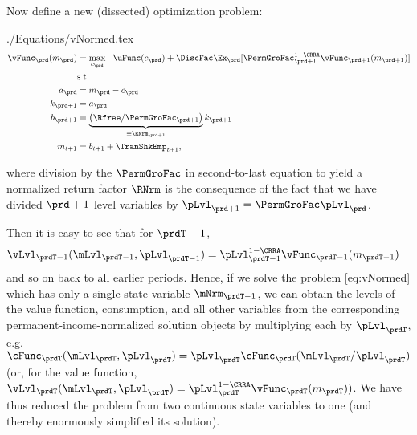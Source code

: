 \documentclass[\econtexRoot/SolvingMicroDSOPs]{subfiles}
\begin{document}
Now define a new (dissected) optimization problem:
\begin{verbatimwrite}{./Equations/vNormed.tex}
  \begin{equation}\begin{gathered}\begin{aligned}
        {\vFunc}_{\prd}({m}_{\prd}) & = \max_{{c}_{\prd}} ~~ \uFunc({c}_{\prd})+
        {\DiscFac}\Ex_{\prd}[ \PermGroFac_{\prd+1}^{1-\CRRA}{\vFunc}_{\prd+1}({m}_{\prd+1})] \label{eq:vNormed}                   \\
                                         & \text{s.t.}                                                                                 \\
        {a}_{\prd}                       & = {m}_{\prd}-{c}_{\prd}                                                                     \\
        {k}_{\prd+1}                     & = {a}_{\prd}                                                                                \\
        {b}_{\prd+1}                     & = \underbrace{\left(\Rfree/\PermGroFac_{\prd+1}\right)}_{\equiv \RNrm_{\prd+1}}{k}_{\prd+1} \\
        {m}_{t+1}                        & = {b}_{t+1}+\TranShkEmp_{t+1},
      \end{aligned}\end{gathered}\end{equation}
\end{verbatimwrite}
\unskip
where division by the $\PermGroFac$ in second-to-last equation to yield a normalized return factor $\RNrm$ is the consequence of the fact that we have divided $\prd+1$ level variables by $\pLvl_{\prd+1}=\PermGroFac\pLvl_{\prd}$.

Then it is easy to see that for $\prdT-1$, 
\begin{equation*}\begin{gathered}\begin{aligned}
      {\vLvl}_{\prdT-1}(\mLvl_{\prdT-1},\pLvl_{\prdT-1}) & =  \pLvl_{\prdT-1}^{1-\CRRA}{\vFunc}_{\prdT-1}({m}_{\prdT-1})
    \end{aligned}\end{gathered}\end{equation*}
and so on back to all earlier periods.  Hence, if we solve the problem \eqref{eq:vNormed} which has only a single state variable $\mNrm_{\prdT-1}$, we can obtain the levels of the value function, consumption, and all other variables from the corresponding permanent-income-normalized solution objects by multiplying each by $\pLvl_{\prdT}$, e.g.\ ${\cFunc}_{\prdT}(\mLvl_{\prdT},\pLvl_{\prdT})=\pLvl_{\prdT}\cFunc_{\prdT}(\mLvl_{\prdT}/\pLvl_{\prdT})$ (or, for the value function, ${\vLvl} _{\prdT}({\mLvl}_{\prdT},\pLvl_{\prdT}) = \pLvl_{\prdT}^{1-\CRRA}\vFunc_{\prdT}({m}_{\prdT}))$.  We have thus reduced the problem from two continuous state variables to one (and thereby enormously simplified its solution).
\end{document}
